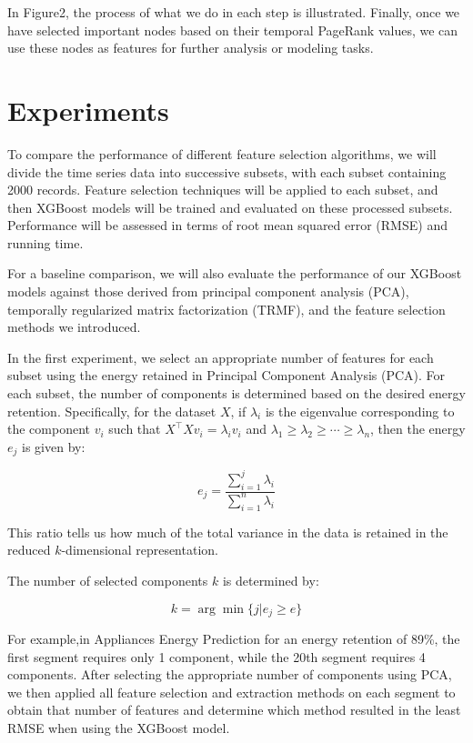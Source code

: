 \documentclass[twoside,11pt]{article}
\begin{document}
In Figure2, the process of what we do in each step is illustrated. Finally, once we have
selected important nodes based on their temporal PageRank values, we can use these nodes
as features for further analysis or modeling tasks.
\section{Experiments}


To compare the performance of different feature selection algorithms, we will divide the time series data into successive subsets, with each subset containing 2000 records. Feature selection techniques will be applied to each subset, and then XGBoost models will be trained and evaluated on these processed subsets. Performance will be assessed in terms of root mean squared error (RMSE) and running time.

For a baseline comparison, we will also evaluate the performance of our XGBoost models against those derived from principal component analysis (PCA), temporally regularized matrix factorization (TRMF), and the feature selection methods we introduced.

In the first experiment, we select an appropriate number of features for each subset using the energy retained in Principal Component Analysis (PCA).
For each subset, the number of components is determined based on the desired energy retention. Specifically, for the dataset \( X \), if \( \lambda_i \) is the eigenvalue corresponding to the component \( v_i \) such that \( X^\top X v_i = \lambda_i v_i \) and \( \lambda_1 \geq \lambda_2 \geq \cdots \geq \lambda_n \), then the energy \( e_j \) is given by:

\[
  e_j = \frac{\sum_{i=1}^{j} \lambda_i}{\sum_{i=1}^{n} \lambda_i}
\]

This ratio tells us how much of the total variance in the data is retained in the reduced \( k \)-dimensional representation.

The number of selected components \( k \) is determined by:

\[
  k = \arg\min \{j| e_j \geq e \}
\]

For example,in Appliances Energy Prediction for an energy retention of 89\%, the first segment requires only 1 component, while the 20th segment requires 4 components.
After selecting the appropriate number of components using PCA, we then applied all feature selection and extraction methods on each segment to obtain that number of features and determine which method resulted in the least RMSE when using the XGBoost model.
\end{document}
